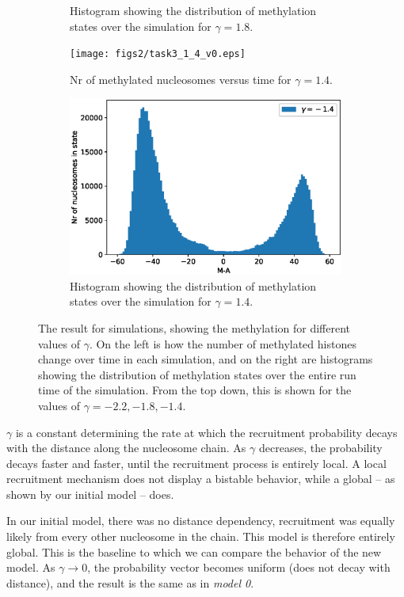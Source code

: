 \documentclass{article}
\begin{document}
\begin{figure}[H]
\begin{subfigure}[b]{.49\textwidth}
		\caption{Histogram showing the distribution of methylation states over the simulation for $\gamma=1.8$.}
		\label{fig:task3_hist_1_8}
	\end{subfigure}
	\begin{subfigure}[b]{.49\textwidth}
		\centering
		\texttt{[image: figs2/task3\_1\_4\_v0.eps]}
		\caption{Nr of methylated nucleosomes versus time for $\gamma=1.4$.}
		\label{fig:task3_m_vs_t_1_4}
	\end{subfigure}
	\begin{subfigure}[b]{.49\textwidth}
		\centering
		\includegraphics[width= \linewidth]{figs2/task3_hist_1_4_v0.eps}
		\caption{Histogram showing the distribution of methylation states over the simulation for $\gamma=1.4$.}
		\label{fig:task3_hist_1_4}
	\end{subfigure}
		\caption{The result for simulations, showing the methylation for different values of $\gamma$. On the left is how the number of methylated histones change over time in each simulation, and on the right are histograms showing the distribution of methylation states over the entire run time of the simulation. From the top down, this is shown for the values of $\gamma = {-2.2, -1.8, -1.4}$.}
		\label{fig:task3}
\end{figure}

$\gamma$ is a constant determining the rate at which the recruitment probability decays with the distance along the nucleosome chain. As $\gamma$ decreases, the probability decays faster and faster, until the recruitment process is entirely local. A local recruitment mechanism does not display a bistable behavior, while a global -- as shown by our initial model -- does. 

In our initial model, there was no distance dependency, recruitment was equally likely from every other nucleosome in the chain. This model is therefore entirely global. 
This is the baseline to which we can compare the behavior of the new model. 
As $\gamma\to 0$, the probability vector becomes uniform (does not decay with distance), and the result is the same as in \textit{model 0}.
\end{document}
